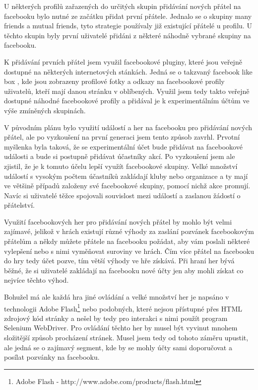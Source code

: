 \documentclass[thesis=M,czech]{FITthesis}[2013/05/10]
\begin{document}
U některých profilů zařazených do určitých skupin přidávání nových přátel na facebooku bylo nutné ze začátku přidat první přátele. Jednalo se o skupiny many friends a mutual friends, tyto strategie používaly již existující přátelé u profilu. U těchto skupin byly první uživatelé přidáni z některé náhodně vybrané skupiny na facebooku. 

K přidávání prvních přátel jsem využil facebookové pluginy, které jsou veřejně dostupné na některých internetových stánkách. Jedná se o takzvaný facebook like box \cite{web:fbLikeBox}, kde jsou zobrazeny profilové fotky a odkazy na facebookové profily uživatelů, kteří mají danou stránku v oblíbených. Využil jsem tedy takto veřejně dostupné náhodné facebookové profily a přidával je k experimentálním účtům ve výše zmíněných skupinách.

V původním plánu bylo využití událostí a her na facebooku pro přidávání nových přátel, ale po vyzkoušení na první generaci jsem tento způsob zavrhl. Prvotní myšlenka byla taková, že se experimentální účet bude přidávat na facebookové události a bude si postupně přidávat účastníky akcí. Po vyzkoušení jsem ale zjistil, že je k tomuto účelu lepší využít facebookové skupiny. Velké množství událostí s vysokým počtem účastníků zakládají kluby nebo organizace a ty mají ve většině případů založeny své facebookové skupiny, pomocí nichž akce promují. Navíc si uživatelé těžce spojovali souvislost mezi událostí a zaslanou žádostí o přátelství.

Využití facebookových her pro přidávání nových přátel by mohlo být velmi zajímavé, jelikož v hrách existují různé výhody za zaslání pozvánek facebookovým přátelům a někdy můžete přátele na facebooku požádat, aby vám poslali některé vylepšení nebo s nimi vyměňovat suroviny ve hrách. Čím více přátel na facebooku do hry tedy účet pozve, tím větší výhody ve hře získává. Při hraní her bývá běžné, že si uživatelé zakládají na facebooku nové účty jen aby mohli získat co nejvíce těchto výhod.

Bohužel má ale každá hra jiné ovládání a velké množství her je napsáno v technologii Adobe Flash\footnote{Adobe Flash - http://www.adobe.com/products/flash.html} nebo podobných, které nejsou přístupné přes HTML zdrojový kód stránky a nešel by tedy pro interakci s nimi použít program Selenium WebDriver. Pro ovládání těchto her by musel být vyvinut mnohem složitější způsob procházení stránek. Musel jsem tedy od tohoto záměru upustit, ale jedná se o zajímavý segment, kde by se mohly účty sami doporučovat a posílat pozvánky na facebooku.
\end{document}
